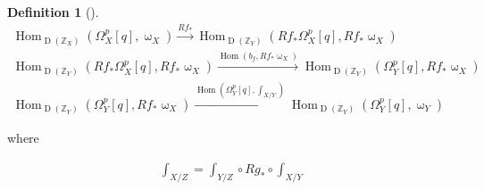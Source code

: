 \documentclass[a4paper,dvipdfmx,reqno,12pt]{amsart}
\theoremstyle{definition}
\newtheorem{Def}[Thm]{Definition}
\newcommand{\Z}{\mathbb{Z}}%
\newcommand{\opn}[1]{\operatorname{#1}}
\newcommand{\xto}[1]{\xrightarrow{#1}}
\numberwithin{equation}{section}
\begin{document}
\begin{Def}[{\cite[Definition 4.9]{gross2019sheaftheoretic}}]

  \begin{align}
    \opn{Hom}_{\opn{D}(\Z_X)}(\Omega_X^{p}[q],\upomega_X)\xto{Rf_*}
    \opn{Hom}_{\opn{D}(\Z_Y)}(Rf_*\Omega_X^{p}[q],Rf_*\upomega_X)
    \\
    \opn{Hom}_{\opn{D}(\Z_Y)}(Rf_*\Omega_X^{p}[q],Rf_*\upomega_X)
    \xto{\opn{Hom}(b_{f},Rf_*\upomega_X)}
    \opn{Hom}_{\opn{D}(\Z_Y)}(\Omega^{p}_Y[q],Rf_*\upomega_X) \\
    \opn{Hom}_{\opn{D}(\Z_Y)}(\Omega^{p}_Y[q],Rf_*\upomega_X)
    \xto{\opn{Hom}(\Omega_Y^{p}[q],\int_{X/Y})} \opn{Hom}_{\opn{D}(\Z_Y)}(\Omega_Y^{p}[q],\upomega_Y)
  \end{align}

  where

\end{Def}

\begin{align}
  \int_{X/Z}=\int_{Y/Z} \circ Rg_*\circ \int_{X/Y}
\end{align}
\end{document}
